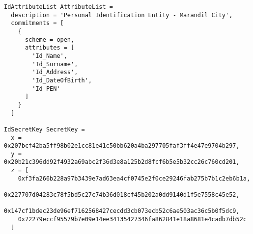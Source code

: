 \small
\begin{verbatim}
IdAttributeList AttributeList =
  description = 'Personal Identification Entity - Marandil City',
  commitments = [
    {
      scheme = open,
      attributes = [
        'Id_Name',
        'Id_Surname',
        'Id_Address',
        'Id_DateOfBirth',
        'Id_PEN'
      ]
    }
  ]

IdSecretKey SecretKey =
  x = 0x207bcf42ba5ff98b02e1cc81e41c50bb620a4ba297705faf3ff4e47e9704b297,
  y = 0x20b21c396dd92f4932a69abc2f36d3e8a125b2d8fcf6b5e5b32cc26c760cd201,
  z = [
    0xf3fa266b228a97b3439e7ad63ea4cf0745e2f0ce29246fab275b7b1c2eb6b1a,
    0x227707d04283c78f5bd5c27c74b36d018cf45b202a0dd9140d1f5e7558c45e52,
    0x147cf1bdec23de96ef7162568427cecdd3cb073ecb52c6ae503ac36c5b0f5dc9,
    0x72279eccf95579b7e09e14ee34135427346fa862841e18a8681e4cadb7db52c
  ]


\end{verbatim}
